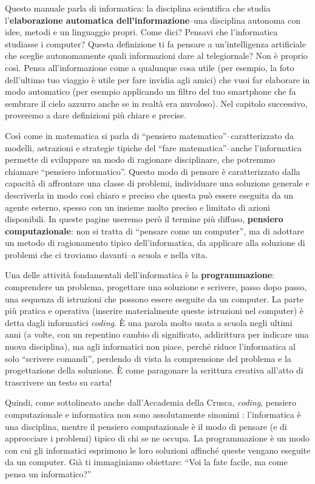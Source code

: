 Questo manuale parla di informatica: la disciplina scientifica che studia l'\textbf{elaborazione automatica dell'informazione}--una disciplina autonoma con idee, metodi e un linguaggio propri. Come dici? Pensavi che l'informatica studiasse i computer? Questa definizione ti fa pensare a un'intelligenza artificiale che sceglie autonomamente quali informazioni dare al telegiornale? Non è proprio così. Pensa all'informazione come a qualunque cosa utile (per esempio, la foto dell'ultimo tuo viaggio è utile per fare invidia agli amici) che vuoi far elaborare in modo automatico (per esempio applicando un filtro del tuo smartphone che fa sembrare il cielo azzurro anche se in realtà era nuvoloso). Nel capitolo successivo, proveremo a dare definizioni più chiare e precise.

Così come in matematica si parla di ``pensiero matematico''--caratterizzato da modelli, astrazioni e strategie tipiche del ``fare matematica''--anche l'informatica permette di sviluppare un modo di ragionare disciplinare, che potremmo chiamare ``pensiero informatico''. Questo modo di pensare è caratterizzato dalla capacità di affrontare una classe di problemi, individuare una soluzione generale e descriverla in modo così chiaro e preciso che questa può essere eseguita da un agente esterno, spesso con un insieme molto preciso e limitato di azioni disponibili. In queste pagine useremo però il termine più diffuso, \textbf{pensiero computazionale}: non si tratta di ``pensare come un computer'', ma di adottare un metodo di ragionamento tipico dell'informatica, da applicare alla soluzione di problemi che ci troviamo davanti--a scuola e nella vita.

Una delle attività fondamentali dell'informatica è la \textbf{programmazione}: comprendere un problema, progettare una soluzione e scrivere, passo dopo passo, una sequenza di istruzioni che possono essere eseguite da un computer. La parte più pratica e operativa (inserire materialmente queste istruzioni nel computer) è detta dagli informatici \textit{coding}. È una parola molto usata a scuola negli ultimi anni (a volte, con un repentino cambio di significato, addirittura per indicare una nuova disciplina), ma agli informatici non piace, perché riduce l'informatica al solo ``scrivere comandi'', perdendo di vista la comprensione del problema e la progettazione della soluzione. È come paragonare la scrittura creativa all'atto di trascrivere un testo su carta!

Quindi, come sottolineato anche dall'Accademia della Crusca, \textit{coding}, pensiero computazionale e informatica non sono assolutamente sinonimi \parencite{lodi-martini-2024}: l'informatica è una disciplina, mentre il pensiero computazionale è il modo di pensare (e di approcciare i problemi) tipico di chi se ne occupa. La programmazione è un modo con cui gli informatici esprimono le loro soluzioni affinché queste vengano eseguite da un computer. Già ti immaginiamo obiettare: ``Voi la fate facile, ma come pensa un informatico?''  

